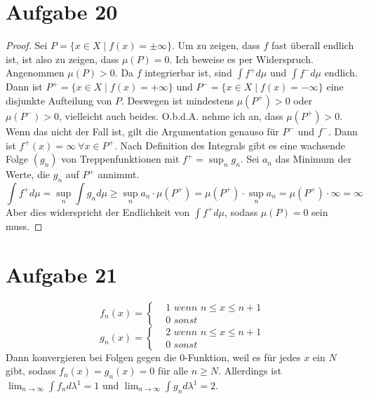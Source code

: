 \documentclass[10pt,a4paper]{article}
\begin{document}
\section{Aufgabe 20}
\begin{proof}
  Sei $P = \{ x \in X \mid f(x) = \pm \infty \}$.
  Um zu zeigen, dass $f$ fast überall endlich ist, ist also zu zeigen, dass $\mu(P) = 0$.
  Ich beweise es per Widerspruch.
  Angenommen $\mu(P) > 0$.
  Da $f$ integrierbar ist, sind $\int f^{+} d\mu$ und $\int f^{-} d\mu$ endlich.
  Dann ist $P^{+} = \{ x \in X \mid f(x) = +\infty \}$ und $P^{-} = \{ x \in X \mid f(x) = -\infty \}$ eine disjunkte Aufteilung von $P$.
  Deswegen ist mindestens $\mu(P^{+}) > 0$ oder $\mu(P^{-}) > 0$, vielleicht auch beides.
  O.b.d.A. nehme ich an, dass $\mu(P^{+}) > 0$.
  Wenn das nicht der Fall ist, gilt die Argumentation genauso für $P^{-}$ und $f^{-}$.
  Dann ist $f^{+}(x) = \infty\ \forall x \in P^{+}$.
  Nach Definition des Integrals gibt es eine wachsende Folge $(g_{n})$ von Treppenfunktionen mit $f^{+} = \sup_{n} g_{n}$.
  Sei $a_{n}$ das Minimum der Werte, die $g_{n}$ auf $P^{+}$ annimmt.
  \begin{equation}
    \int f^{+} d\mu = \sup_{n} \int g_{n} d\mu \ge \sup_{n} a_{n} \cdot \mu(P^{+}) = \mu(P^{+}) \cdot \sup_{n} a_{n} = \mu(P^{+}) \cdot \infty = \infty
  \end{equation}
  Aber dies widerspricht der Endlichkeit von $\int f^{+} d\mu$, sodass $\mu(P) = 0$ sein muss.
\end{proof}

\section{Aufgabe 21}
\begin{equation}
  f_{n}(x) = 
  \begin{cases}
    & 1\textit{ wenn $n \le x \le n + 1$}\\
    & 0\textit{ sonst}
  \end{cases}
\end{equation}
\begin{equation}
  g_{n}(x) = 
  \begin{cases}
    & 2\textit{ wenn $n \le x \le n + 1$}\\
    & 0\textit{ sonst}
  \end{cases}
\end{equation}
Dann konvergieren bei Folgen gegen die $0$-Funktion, weil es für jedes $x$ ein $N$ gibt, sodass $f_{n}(x) = g_{n}(x) = 0$ für alle $n \ge N$.
Allerdings ist $\lim_{n \rightarrow \infty} \int f_{n} d \lambda^{1} = 1$ und $\lim_{n \rightarrow \infty} \int g_{n} d \lambda^{1} = 2$.
\end{document}
